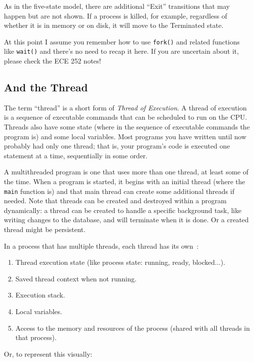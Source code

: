 As in the five-state model, there are additional ``Exit'' transitions that may happen but are not shown. If a process is killed, for example, regardless of whether it is in memory or on disk, it will move to the Terminated state.

At this point I assume you remember how to use \texttt{fork()} and related functions like \texttt{wait()} and there's no need to recap it here. If you are uncertain about it, please check the ECE 252 notes!

\subsection*{And the Thread}

The term ``thread'' is a short form of \textit{Thread of Execution}. A thread of execution is a sequence of executable commands that can be scheduled to run on the CPU. Threads also have some state (where in the sequence of executable commands the program is) and some local variables. Most programs you have written until now probably had only one thread; that is, your program's code is executed one statement at a time, sequentially in some order.

A multithreaded program is one that uses more than one thread, at least some of the time. When a program is started, it begins with an initial thread (where the \texttt{main} function is) and that main thread can create some additional threads if needed. Note that threads can be created and destroyed within a program dynamically: a thread can be created to handle a specific background task, like writing changes to the database, and will terminate when it is done. Or a created thread might be persistent.

In a process that has multiple threads, each thread has its own~\cite{osi}:
\begin{enumerate}
	\item Thread execution state (like process state: running, ready, blocked...).
	\item Saved thread context when not running.
	\item Execution stack.
	\item Local variables.
	\item Access to the memory and resources of the process (shared with all threads in that process).
\end{enumerate}

Or, to represent this visually:

